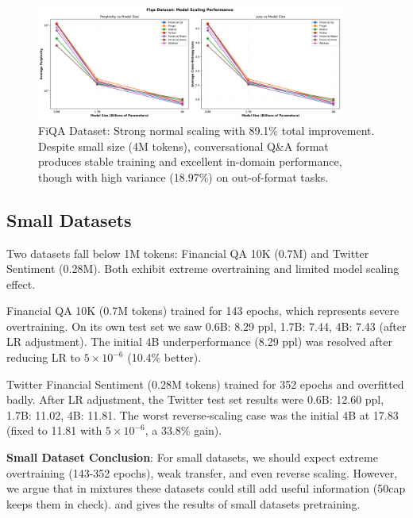 \begin{figure}[htbp]
\centering
\includegraphics[width=0.9\textwidth]{figures/scaling_fiqa.png}
\caption[FiQA Dataset: Scaling Behavior]{FiQA Dataset: Strong normal scaling with 89.1\% total improvement. Despite small size (4M tokens), conversational Q\&A format produces stable training and excellent in-domain performance, though with high variance (18.97\%) on out-of-format tasks.}
\label{fig:scaling_fiqa}
\end{figure}







\subsection{Small Datasets}

Two datasets fall below 1M tokens: Financial QA 10K (0.7M) and Twitter Sentiment (0.28M). Both exhibit extreme overtraining and limited model scaling effect.

Financial QA 10K (0.7M tokens) trained for 143 epochs, which represents severe overtraining. On its own test set we saw 0.6B: 8.29 ppl, 1.7B: 7.44, 4B: 7.43 (after LR adjustment). The initial 4B underperformance (8.29 ppl) was resolved after reducing LR to $5\times10^{-6}$ (10.4\% better).

Twitter Financial Sentiment (0.28M tokens) trained for 352 epochs and overfitted badly. After LR adjustment, the Twitter test set results were 0.6B: 12.60 ppl, 1.7B: 11.02, 4B: 11.81. The worst reverse‑scaling case was the initial 4B at 17.83 (fixed to 11.81 with $5\times10^{-6}$, a 33.8\% gain).

\textbf{Small Dataset Conclusion}: For small datasets, we should expect extreme overtraining (143-352 epochs), weak transfer, and even reverse scaling. However, we argue that in mixtures these datasets could still add useful information (50cap keeps them in check).  and  gives the results of small datasets pretraining.

